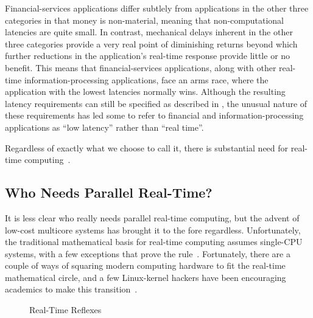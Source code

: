Financial-services applications differ subtlely from applications in
the other three categories in that money is non-material, meaning that
non-computational latencies are quite small.
In contrast, mechanical delays inherent in the other three categories
provide a very real point of diminishing returns beyond which further
reductions in the application's real-time response provide little or
no benefit.
This means that financial-services applications, along with other
real-time information-processing applications, face an arms race,
where the application with the lowest latencies normally wins.
Although the resulting latency requirements can still be specified
as described in
,
the unusual nature of these requirements has led some to refer to
financial and information-processing applications as ``low latency''
rather than ``real time''.

Regardless of exactly what we choose to call it, there is substantial
need for real-time
computing~\cite{JeremyWPeters2006NYTDec11,BillInmon2007a}.

\subsection{Who Needs Parallel Real-Time?}
\label{sec:advsync:Who Needs Parallel Real-Time?}

It is less clear who really needs parallel real-time computing, but
the advent of low-cost multicore systems has brought it to the fore
regardless.
Unfortunately, the traditional mathematical basis for real-time
computing assumes single-CPU systems, with a few exceptions that
prove the rule~\cite{BjoernBrandenburgPhD}.
Fortunately, there are a couple of ways of squaring modern computing
hardware to fit the real-time mathematical circle, and a few Linux-kernel
hackers have been encouraging academics to make this
transition~\cite{DanielBristot2019RTtrace,ThomasGleixner2010AcademiaVsReality}.

\begin{figure}[tb]
\centering
{}
\caption{Real-Time Reflexes}
\label{fig:advsync:Real-Time Reflexes}
\end{figure}

